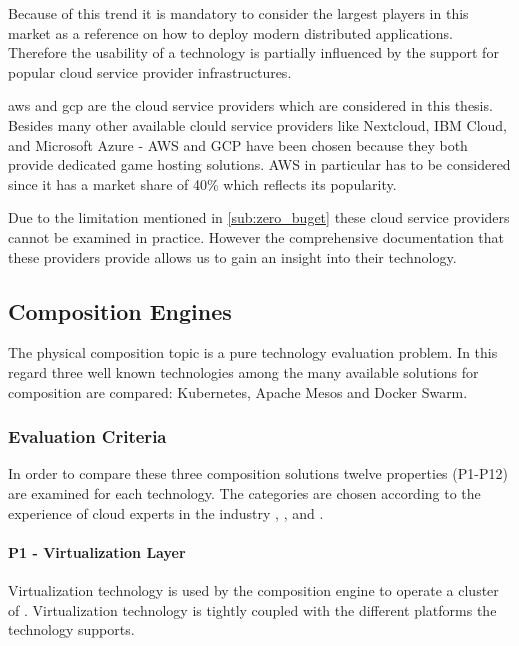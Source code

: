 Because of this trend it is mandatory to consider the largest players in this
market as a reference on how to deploy modern distributed applications. Therefore the
usability of a technology is partially influenced by the support for popular
cloud service provider infrastructures. 

\gls{aws} and \gls{gcp} are the cloud service
providers which are considered in this thesis. Besides many other available
clould service providers like Nextcloud, IBM Cloud, and Microsoft Azure - AWS
and GCP have been chosen because they both provide dedicated game hosting
solutions. AWS in particular has to be considered since it has a market share of
40\% \cite{harvey2017cloud_providers} which reflects its popularity.

Due to the limitation mentioned in \autoref{sub:zero_buget} these cloud service
providers cannot be examined in practice. However the comprehensive
documentation that these providers provide allows us to gain an insight into
their technology.

\newpage
\subsection{Composition Engines}
\label{sub:composition_engines}

The physical \ms{} composition topic is a pure technology evaluation problem.
In this regard three well known technologies among the many available solutions 
for \ms{} composition are compared: Kubernetes, Apache Mesos and Docker Swarm.

\subsubsection{Evaluation Criteria}

In order to compare these three composition solutions twelve properties
(P1-P12) are examined for each technology. The categories are chosen according
to the experience of cloud experts in the industry
\cite{toll2016cloud_expert_eval}, \cite{lerilli2012cloud_eval_criteria}, and
\cite{voras2011evaluating}.


\paragraph{P1 - Virtualization Layer}

Virtualization technology is used by the composition engine to operate a
cluster of \mss{}. Virtualization technology is tightly coupled with the
different platforms the technology supports.

